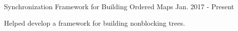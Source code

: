 \begin{cventries}
  \cvexpdetail
    {Synchronization Framework for Building Ordered Maps} %
    {Jan. 2017 - Present} %
    {
      \begin{cvitems} %
        \item {Helped develop a framework for building nonblocking trees.}
      \end{cvitems}
    }
    
\end{cventries}
